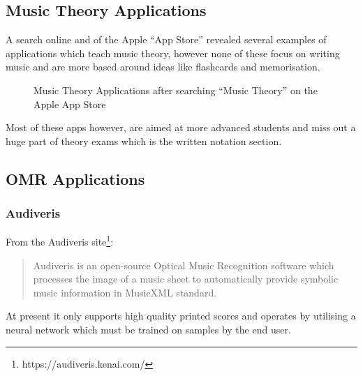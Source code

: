 \subsection{Music Theory Applications}
A search online and of the Apple ``App Store'' revealed several examples of applications which teach music theory, however none of these focus on writing music and are more based around ideas like flashcards and memorisation.

\begin{figure}[h!]
  \centering
  \caption{Music Theory Applications after searching ``Music Theory'' on the Apple App Store}
\end{figure}

Most of these apps however, are aimed at more advanced students and miss out a huge part of theory exams which is the written notation section.


\subsection{OMR Applications}
\subsubsection{Audiveris}
From the Audiveris site\footnote{https://audiveris.kenai.com/}:
\begin{quotation}
Audiveris is an open-source Optical Music Recognition software which processes the image of a music sheet to automatically provide symbolic music information in MusicXML standard.
\end{quotation}

At present it only supports high quality printed scores and operates by utilising a neural network which must be trained on samples by the end user.

